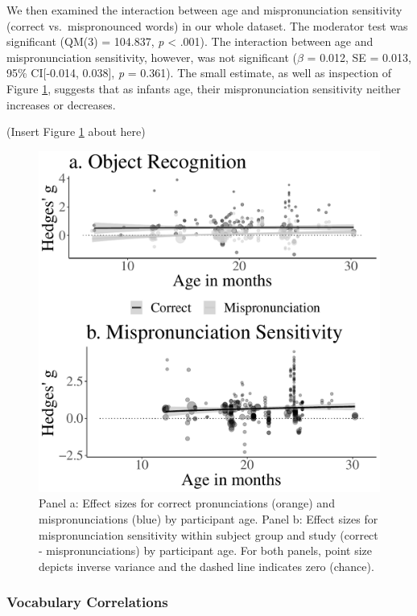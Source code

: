 \documentclass[
  man, noextraspace]{apa6}
\begin{document}
We then examined the interaction between age and mispronunciation sensitivity (correct vs.~mispronounced words) in our whole dataset. The moderator test was significant (QM(3) = 104.837, \emph{p} \textless{} .001). The interaction between age and mispronunciation sensitivity, however, was not significant (\(\beta\) = 0.012, SE = 0.013, 95\% CI{[}-0.014, 0.038{]}, \emph{p} = 0.361). The small estimate, as well as inspection of Figure \ref{fig:PlotMPEffect}, suggests that as infants age, their mispronunciation sensitivity neither increases or decreases.

(Insert Figure \ref{fig:PlotMPEffect} about here)

\begin{figure}
\centering
\includegraphics{VonHolzenBergmann_MPMetaAnalysis_files/figure-latex/PlotMPEffect-1.pdf}
\caption{\label{fig:PlotMPEffect}Panel a: Effect sizes for correct pronunciations (orange) and mispronunciations (blue) by participant age. Panel b: Effect sizes for mispronunciation sensitivity within subject group and study (correct - mispronunciations) by participant age. For both panels, point size depicts inverse variance and the dashed line indicates zero (chance).}
\end{figure}

\hypertarget{vocabulary-correlations}{%
\subsubsection{Vocabulary Correlations}\label{vocabulary-correlations}}
\end{document}
